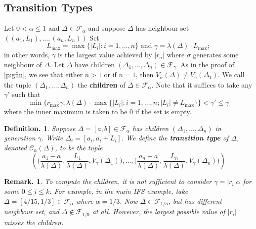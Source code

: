 \documentclass[11pt, a4paper]{memoir}
\theoremstyle{change}
\theoremstyle{plain}
\theoremstyle{nonumberplain}
\newtheorem{definition}{Definition.}
\newtheorem{remark}{Remark.}
\numberwithin{equation}{section}
\begin{document}
\subsection{Transition Types}
Let $0<\alpha\leq 1$ and $\Delta\in\mathcal{F}_\alpha$ and suppose $\Delta$ has neighbour set $((a_1,L_1),\ldots,(a_n,L_n))$
Set
\begin{equation*}
    L_{\max}=\max\{|L_i|:i=1,\ldots,n\}\text{ and }\gamma = \lambda(\Delta)\cdot L_{\max};
\end{equation*}
in other words, $\gamma$ is the largest value achieved by $|r_\sigma|$ where $\sigma$ generates some neighbour of $\Delta$.
Let $\Delta$ have children $(\Delta_1,\ldots,\Delta_n)\in\mathcal{F}_\gamma$.
As in the proof of \cref{p:gfin}, we see that either $n>1$ or if $n=1$, then $V_\alpha(\Delta)\neq V_\gamma(\Delta_1)$.
We call the tuple $(\Delta_1,\ldots,\Delta_n)$ the \textbf{children} of $\Delta\in\mathcal{F}_\alpha$.
Note that it suffices to take any $\gamma'$ such that
\begin{equation*}
    \min\bigl\{r_{\max}\gamma,\lambda(\Delta)\cdot\max\{|L_i|:i=1,\ldots,n; |L_i|\neq L_{\max}\}\bigr\}<\gamma'\leq\gamma
\end{equation*}
where the inner maximum is taken to be 0 if the set is empty.
\begin{definition}
    Suppose $\Delta=[a,b]\in\mathcal{F}_\alpha$ has children $(\Delta_1,\ldots,\Delta_n)$ in generation $\gamma$.
    Write $\Delta_i=[a_i,a_i+L_i]$.
    We define the \textbf{transition type} of $\Delta$, denoted $\mathcal{C}_\alpha(\Delta)$, to be the tuple
    \begin{equation*}
        \left(\bigl(\frac{a_1-a}{\lambda(\Delta)},\frac{L_1}{\lambda(\Delta)},V_\gamma(\Delta_1)\bigr),\ldots,\bigl(\frac{a_n-a}{\lambda(\Delta)},\frac{L_n}{\lambda(\Delta)},V_\gamma(\Delta_n)\bigr)\right)
    \end{equation*}
\end{definition}
\begin{remark}
    To compute the children, it is not sufficient to consider $\gamma=|r_i|\alpha$ for some $0\leq i \leq k$.
    For example, in the main IFS example, take $\Delta=[4/15, 1/3]\in\mathcal{F}_\alpha$ where $\alpha=1/3$.
    Now $\Delta\in \mathcal{F}_{1/5}$, but has different neighbour set, and $\Delta\notin\mathcal{F}_{1/9}$ at all.
    However, the largest possible value of $|r_i|$ misses the children.
\end{remark}
\end{document}
